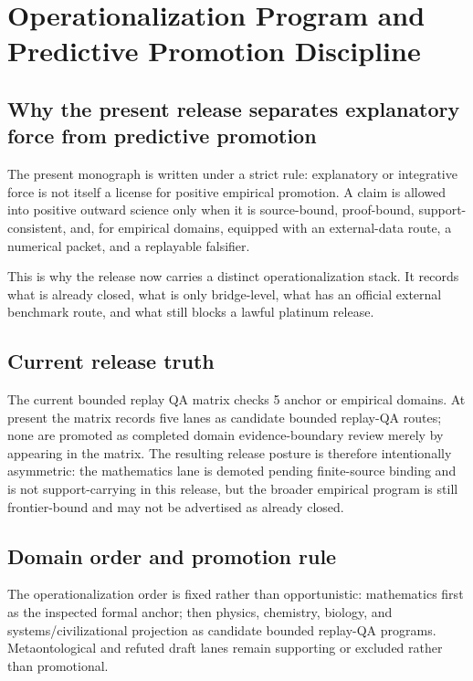 \section{Operationalization Program and Predictive Promotion Discipline}
\label{sec:oc-core-1-3-operationalization-program}

\subsection{Why the present release separates explanatory force from predictive promotion}
\label{sec:oc13-prediction-claim-taxonomy-v3}
The present monograph is written under a strict rule: explanatory or integrative force is not itself a license for positive empirical promotion.
A claim is allowed into positive outward science only when it is source-bound, proof-bound, support-consistent, and, for empirical domains, equipped with an external-data route, a numerical packet, and a replayable falsifier.

This is why the release now carries a distinct operationalization stack. It records what is already closed, what is only bridge-level, what has an official external benchmark route, and what still blocks a lawful platinum release.

\subsection{Current release truth}
The current bounded replay QA matrix checks 5 anchor or empirical domains.
At present the matrix records five lanes as candidate bounded replay-QA routes; none are promoted as completed domain evidence-boundary review merely by appearing in the matrix.
The resulting release posture is therefore intentionally asymmetric: the mathematics lane is demoted pending finite-source binding and is not support-carrying in this release, but the broader empirical program is still frontier-bound and may not be advertised as already closed.

\subsection{Domain order and promotion rule}
The operationalization order is fixed rather than opportunistic: mathematics first as the inspected formal anchor; then physics, chemistry, biology, and systems/civilizational projection as candidate bounded replay-QA programs. Metaontological and refuted draft lanes remain supporting or excluded rather than promotional.

